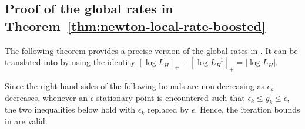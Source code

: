 \subsection{Proof of the global rates in Theorem~\ref{thm:newton-local-rate-boosted}} \label{sec:appendix/global-rate-proof}

The following theorem provides a precise version of the global rates in .  
It can be translated into  by using the identity $[\log L_H]_+ + [\log L_H^{-1}]_+ = |\log L_H|$.  

Since the right-hand sides of the following bounds are non-decreasing as $\epsilon_k$ decreases,  
whenever an $\epsilon$-stationary point is encountered such that $\epsilon_k \leq g_k \leq \epsilon$,  
the two inequalities below hold with $\epsilon_k$ replaced by $\epsilon$.  
Hence, the iteration bounds in  are valid.


